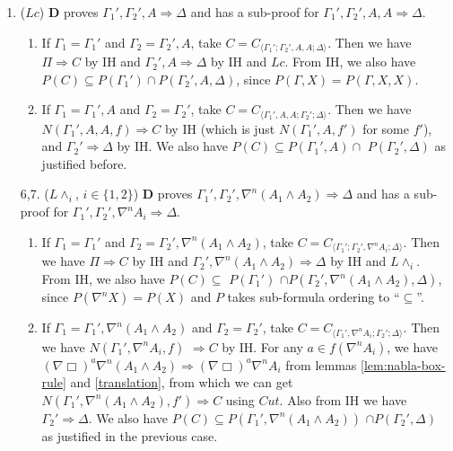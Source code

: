 \begin{enumerate}
	\item ($Lc$) $\mathbf{D}$ proves $\Gamma_1' , \Gamma_2' , A \Rightarrow \Delta$ and has a sub-proof for $\Gamma_1' , \Gamma_2' , A , A \Rightarrow \Delta$.
	\begin{enumerate}
		\item If $\Gamma_1 = \Gamma_1'$ and $\Gamma_2 = \Gamma_2' , A$, take $C = C_{\langle\Gamma_1';\Gamma_2',A,A;\Delta\rangle}$. Then we have $\Pi \Rightarrow C$ by IH and $\Gamma_2' , A \Rightarrow \Delta$ by IH and $Lc$. From IH, we also have $P(C) \subseteq P(\Gamma_1') \cap P(\Gamma_2',A,\Delta)$, since $P(\Gamma,X) = P(\Gamma,X,X)$.
		
		\item If $\Gamma_1 = \Gamma_1' , A$ and $\Gamma_2 = \Gamma_2'$, take $C = C_{\langle\Gamma_1',A,A;\Gamma_2';\Delta\rangle}$. Then we have $N(\Gamma_1',A,A,f) \Rightarrow C$ by IH (which is just $N(\Gamma_1',A,f')$ for some $f'$), and $\Gamma_2' \Rightarrow \Delta$ by IH. We also have $P(C) \subseteq P(\Gamma_1',A) \cap$ $P(\Gamma_2',\Delta)$ as justified before.
	\end{enumerate}

	\item[6,7.] ($L\land_i$, {\small$i \in \{1,2\}$}) $\mathbf{D}$ proves $\Gamma_1' , \Gamma_2' , \nabla^n (A_1 \land A_2) \Rightarrow \Delta$ and has a sub-proof for $\Gamma_1' , \Gamma_2' , \nabla^n A_i \Rightarrow \Delta$.
	\begin{enumerate}
		\item If $\Gamma_1 = \Gamma_1'$ and $\Gamma_2 = \Gamma_2' , \nabla^n (A_1 \land A_2)$, take $C = C_{\langle\Gamma_1';\Gamma_2',\nabla^n A_i;\Delta\rangle}$. Then we have $\Pi \Rightarrow C$ by IH and $\Gamma_2' , \nabla^n (A_1 \land A_2) \Rightarrow \Delta$ by IH and $L\land_i$. From IH, we also have $P(C) \subseteq$ $P(\Gamma_1')$ $\cap P(\Gamma_2',\nabla^n(A_1 \land A_2),\Delta)$, since $P(\nabla^n X) = P(X)$ and $P$ takes sub-formula ordering to ``$\subseteq$''.
		
		\item If $\Gamma_1 = \Gamma_1' , \nabla^n (A_1 \land A_2)$ and $\Gamma_2 = \Gamma_2'$, take $C = C_{\langle\Gamma_1',\nabla^n A_i;\Gamma_2';\Delta\rangle}$. Then we have $N(\Gamma_1',\nabla^n A_i,f)$ $\Rightarrow C$ by IH. For any $a \in f(\nabla^n A_i)$, we have $(\nabla\Box)^a \nabla^n (A_1 \land A_2) \Rightarrow (\nabla\Box)^a \nabla^n A_i$ from lemmas \ref{lem:nabla-box-rule} and \ref{translation}, from which we can get $N(\Gamma_1',\nabla^n (A_1 \land A_2),f') \Rightarrow C$ using $Cut$. Also from IH we have $\Gamma_2' \Rightarrow \Delta$. We also have $P(C) \subseteq P(\Gamma_1',\nabla^n (A_1 \land A_2))$ $\cap P(\Gamma_2',\Delta)$ as justified in the previous case.
	\end{enumerate}
	\setcounter{enumi}{7}


\end{enumerate}
